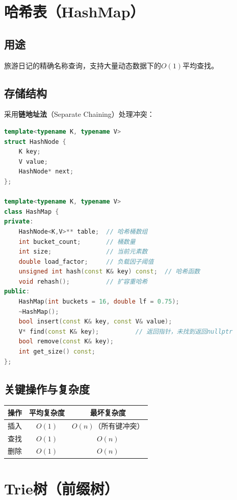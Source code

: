 \documentclass[12pt,a4paper]{report}
\begin{document}
\section{哈希表（HashMap）}

\subsection{用途}
旅游日记的精确名称查询，支持大量动态数据下的$O(1)$平均查找。

\subsection{存储结构}

采用\textbf{链地址法}（Separate Chaining）处理冲突：

\begin{lstlisting}[language=C++, caption={哈希表数据结构定义}]
template<typename K, typename V>
struct HashNode {
    K key;
    V value;
    HashNode* next;
};

template<typename K, typename V>
class HashMap {
private:
    HashNode<K,V>** table;  // 哈希桶数组
    int bucket_count;       // 桶数量
    int size;               // 当前元素数
    double load_factor;     // 负载因子阈值
    unsigned int hash(const K& key) const;  // 哈希函数
    void rehash();          // 扩容重哈希
public:
    HashMap(int buckets = 16, double lf = 0.75);
    ~HashMap();
    bool insert(const K& key, const V& value);
    V* find(const K& key);          // 返回指针，未找到返回nullptr
    bool remove(const K& key);
    int get_size() const;
};
\end{lstlisting}

\subsection{关键操作与复杂度}

\begin{table}[H]
\centering
\begin{tabular}{lcc}
\toprule
\textbf{操作} & \textbf{平均复杂度} & \textbf{最坏复杂度} \\
\midrule
插入 & $O(1)$ & $O(n)$（所有键冲突） \\
查找 & $O(1)$ & $O(n)$ \\
删除 & $O(1)$ & $O(n)$ \\
\bottomrule
\end{tabular}
\end{table}


\section{Trie树（前缀树）}
\end{document}
